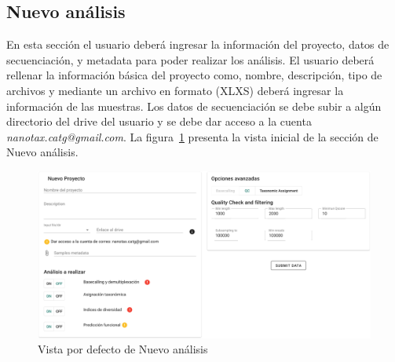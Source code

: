 
    


\subsection{Nuevo análisis}
En esta sección el usuario deberá ingresar la información del proyecto, datos de secuenciación, y metadata para poder realizar los análisis. 
El usuario deberá rellenar la información básica del proyecto como, nombre, descripción, tipo de archivos y mediante un archivo en formato (XLXS) deberá ingresar la información de las muestras. %
Los datos de secuenciación se debe subir a algún directorio del drive del usuario y se debe dar acceso a la cuenta \textit{nanotax.catg@gmail.com}.
La figura~\ref{fig:app-new-analysis-def} presenta la vista inicial de la sección de Nuevo análisis.

\begin{figure}[H]
    \includegraphics[width=1\linewidth]{images/app/newAnalysis/new-analysis-def.png}

    \caption{Vista por defecto de Nuevo análisis}
    \label{fig:app-new-analysis-def}
\end{figure}


